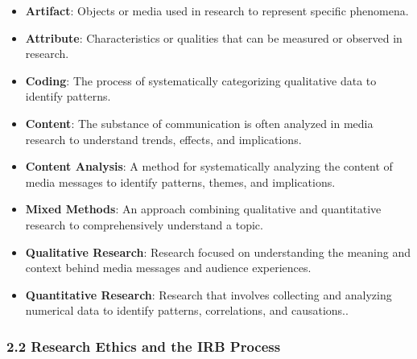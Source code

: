 \documentclass[
]{book}
\providecommand{\tightlist}{%
  \setlength{\itemsep}{0pt}\setlength{\parskip}{0pt}}
\begin{document}
\begin{itemize}
\tightlist
\item
  \textbf{Artifact}: Objects or media used in research to represent specific phenomena.
\item
  \textbf{Attribute}: Characteristics or qualities that can be measured or observed in research.
\item
  \textbf{Coding}: The process of systematically categorizing qualitative data to identify patterns.
\item
  \textbf{Content}: The substance of communication is often analyzed in media research to understand trends, effects, and implications.
\item
  \textbf{Content Analysis}: A method for systematically analyzing the content of media messages to identify patterns, themes, and implications.
\item
  \textbf{Mixed Methods}: An approach combining qualitative and quantitative research to comprehensively understand a topic.
\item
  \textbf{Qualitative Research}: Research focused on understanding the meaning and context behind media messages and audience experiences.
\item
  \textbf{Quantitative Research}: Research that involves collecting and analyzing numerical data to identify patterns, correlations, and causations..
\end{itemize}

\subsubsection*{\texorpdfstring{\textbf{2.2 Research Ethics and the IRB Process}}{2.2 Research Ethics and the IRB Process}}\label{research-ethics-and-the-irb-process-1}
\end{document}
